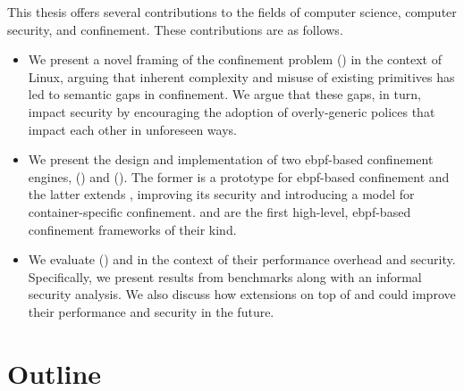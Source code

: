 This thesis offers several contributions to the fields of computer science, computer security, and
confinement. These contributions are as follows.
\begin{itemize}
  \item We present a novel framing of the confinement problem
  () in the context of Linux, arguing that inherent complexity
  and misuse of existing primitives has led to semantic gaps in confinement. We argue that
  these gaps, in turn, impact security by encouraging the adoption of overly-generic
  polices that impact each other in unforeseen ways.

  \item We present the design and implementation of two \gls{ebpf}-based confinement
  engines, \bpfbox{} () and \bpfcontain{} (). The former
  is a prototype for \gls{ebpf}-based confinement and the latter extends \bpfbox{},
  improving its security and introducing a model for container-specific confinement.
  \bpfbox{} and \bpfcontain{} are the first high-level, \gls{ebpf}-based confinement
  frameworks of their kind.

  \item We evaluate () \bpfbox{} and \bpfcontain{} in the context of
  their performance overhead and security. Specifically, we present results from
  benchmarks along with an informal security analysis. We also discuss how extensions on
  top of \bpfbox{} and \bpfcontain{} could improve their performance and security in the
  future.


\end{itemize}

\section{Outline}%
\label{s:outline}

